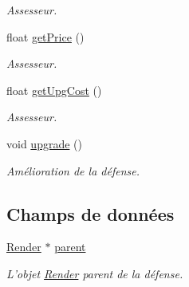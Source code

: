 \begin{DoxyCompactItemize}
\begin{DoxyCompactList}\small\item\em Assesseur. \end{DoxyCompactList}\item 
float \hyperlink{classTower_a604ad233aaa46b85c8dfddc142154697}{getPrice} ()
\begin{DoxyCompactList}\small\item\em Assesseur. \end{DoxyCompactList}\item 
float \hyperlink{classTower_a67d7ca07ddc7b0fec53ca0c2b48295e9}{getUpgCost} ()
\begin{DoxyCompactList}\small\item\em Assesseur. \end{DoxyCompactList}\item 
void \hyperlink{classTower_ac732f3dd9c995a84da0ada08b8346f8f}{upgrade} ()
\begin{DoxyCompactList}\small\item\em Amélioration de la défense. \end{DoxyCompactList}\end{DoxyCompactItemize}
\subsection*{Champs de données}
\begin{DoxyCompactItemize}
\item 
\hyperlink{classRender}{Render} $\ast$ \hyperlink{classTower_af840ab6d1ec47afde8beca150ee5ef60}{parent}
\begin{DoxyCompactList}\small\item\em L'objet \hyperlink{classRender}{Render} parent de la défense. \end{DoxyCompactList}\end{DoxyCompactItemize}
